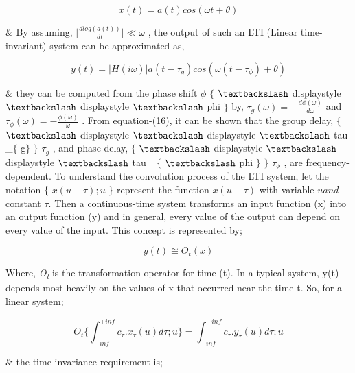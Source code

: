 \begin{enumerate}[label=\roman*]
\begin{equation}\tag{7.7}
x(t) =a(t) cos(\omega t+ \theta)
\end{equation}
\begin{justify}
 $\&$  By assuming,  \(  \vert \frac{dlog(a(t))}{dt} \vert  \ll  \omega  \) , the output of such an LTI (Linear time-invariant) system can be approximated as,
\end{justify}\par


\begin{equation}\tag{7.8}
y(t)=|H(i\omega)|a(t-\tau_g)cos(\omega(t-\tau_{\phi})+\theta)
\end{equation}
\begin{justify}
$\&$  they can be computed from the phase shift  \(  \phi  \)  $ \{ $ $\textbackslash$ displaystyle $\textbackslash$ displaystyle $\textbackslash$ phi $ \} $  by,  \(  \tau_{g} (  \omega  ) =-\frac{d \phi  (  \omega  ) }{d \omega } \)  and  \(  \tau_{ \phi } (  \omega  ) =-\frac{ \phi  (  \omega  ) }{ \omega } \) . From equation-(16), it can be shown that the group delay, $ \{ $ $\textbackslash$ displaystyle $\textbackslash$ displaystyle $\textbackslash$ tau \_$ \{ $ g$ \} $ $ \} $  \(  \tau_{g} \) , and phase delay, $ \{ $ $\textbackslash$ displaystyle $\textbackslash$ displaystyle $\textbackslash$ tau \_$ \{ $ $\textbackslash$ phi $ \} $ $ \} $  \(  \tau_{ \phi } \) , are frequency-dependent. To understand the convolution process of the LTI system, let the notation $ \{ $  \( x ( u- \tau ) ;u \) $ \} $  represent the function  \( x ( u- \tau )  \)  with variable \(  u and \)  constant  \(  \tau. \)  Then a continuous-time system transforms an input function (x) into an output function (y) and in general, every value of the output can depend on every value of the input. This concept is represented by;
\end{justify}\par


\begin{equation}\tag{7.9}
y ( t ) \cong O_{t} ( x )
\end{equation}
\begin{justify}
Where, \textit{O\textsubscript{t }}is the transformation operator for time (t). In a typical system, y(t) depends most heavily on the values of x that occurred near the time t. So, for a linear system;
\end{justify}\par


\begin{equation}\tag{7.10}
O_t\{\int_{-inf}^{+inf}c_{\tau}.x_{\tau}(u)d\tau;u\}=\int_{-inf}^{+inf}c_{\tau}.y_{\tau}(u)d\tau;u
\end{equation}
\begin{justify}
$\&$  the time-invariance requirement is;
\end{justify}\par



\end{enumerate}

